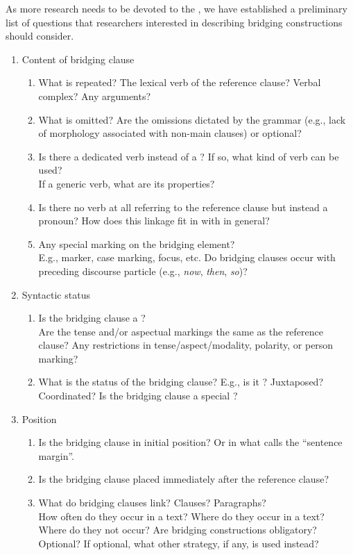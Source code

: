 \documentclass[output=paper]{LSP/langsci}
\begin{document}
As more research needs to be devoted to the , we have established a preliminary list of questions that researchers interested in describing bridging constructions should consider.

\begin{enumerate}
\item   Content of bridging clause
\begin{enumerate}
\item  What is repeated? The lexical verb of the reference clause? Verbal complex? Any arguments? 
\item  What is omitted? Are the omissions dictated by the grammar (e.g., lack of morphology associated with non-main clauses) or optional?
\item  Is there a dedicated verb instead of a ? If so, what kind of verb can be used? \\
If a generic verb, what are its properties?
\item  Is there no verb at all referring to the reference clause but instead a pronoun?
How does this linkage fit in with  in general?
\item  Any special marking on the bridging element?\\ 
E.g.,  marker, case marking, focus, etc. Do bridging clauses occur with preceding discourse particle (e.g., \textit{now}, \textit{then}, \textit{so})? 
\end{enumerate}

\item Syntactic status
\begin{enumerate}
\item  Is the bridging clause a ?\\
Are the tense and/or aspectual markings the same as the reference clause? Any restrictions in tense/aspect/modality, polarity, or person marking?
\item  What is the status of the bridging clause?  
E.g., is it ?  Juxtaposed? Coordinated?
Is the bridging clause a special ?
\end{enumerate}

\item Position
\begin{enumerate}
\item  Is the bridging clause in initial position? Or in what \citet{longacre07} calls the ``sentence margin''. 
\item   Is the bridging clause placed immediately after the reference clause?
\item   What do bridging clauses link? Clauses? Paragraphs?\\
How often do they occur in a text? 
Where do they occur in a text? Where do they not occur?
Are bridging constructions obligatory? Optional? If optional, what other strategy, if any, is used instead?
\end{enumerate}


\end{enumerate}
\end{document}
